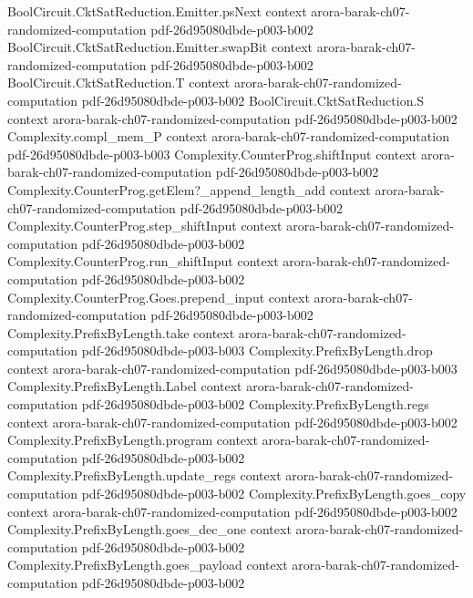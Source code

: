 \begin{theorem}
\proofstep
  {BoolCircuit.CktSatReduction.Emitter.psNext}
  {context}
  {arora-barak-ch07-randomized-computation}
  {pdf-26d95080dbde-p003-b002}
\proofstep
  {BoolCircuit.CktSatReduction.Emitter.swapBit}
  {context}
  {arora-barak-ch07-randomized-computation}
  {pdf-26d95080dbde-p003-b002}
\proofstep
  {BoolCircuit.CktSatReduction.T}
  {context}
  {arora-barak-ch07-randomized-computation}
  {pdf-26d95080dbde-p003-b002}
\proofstep
  {BoolCircuit.CktSatReduction.S}
  {context}
  {arora-barak-ch07-randomized-computation}
  {pdf-26d95080dbde-p003-b002}
\proofstep
  {Complexity.compl_mem_P}
  {context}
  {arora-barak-ch07-randomized-computation}
  {pdf-26d95080dbde-p003-b003}
\proofstep
  {Complexity.CounterProg.shiftInput}
  {context}
  {arora-barak-ch07-randomized-computation}
  {pdf-26d95080dbde-p003-b002}
\proofstep
  {Complexity.CounterProg.getElem?_append_length_add}
  {context}
  {arora-barak-ch07-randomized-computation}
  {pdf-26d95080dbde-p003-b002}
\proofstep
  {Complexity.CounterProg.step_shiftInput}
  {context}
  {arora-barak-ch07-randomized-computation}
  {pdf-26d95080dbde-p003-b002}
\proofstep
  {Complexity.CounterProg.run_shiftInput}
  {context}
  {arora-barak-ch07-randomized-computation}
  {pdf-26d95080dbde-p003-b002}
\proofstep
  {Complexity.CounterProg.Goes.prepend_input}
  {context}
  {arora-barak-ch07-randomized-computation}
  {pdf-26d95080dbde-p003-b002}
\proofstep
  {Complexity.PrefixByLength.take}
  {context}
  {arora-barak-ch07-randomized-computation}
  {pdf-26d95080dbde-p003-b003}
\proofstep
  {Complexity.PrefixByLength.drop}
  {context}
  {arora-barak-ch07-randomized-computation}
  {pdf-26d95080dbde-p003-b003}
\proofstep
  {Complexity.PrefixByLength.Label}
  {context}
  {arora-barak-ch07-randomized-computation}
  {pdf-26d95080dbde-p003-b002}
\proofstep
  {Complexity.PrefixByLength.regs}
  {context}
  {arora-barak-ch07-randomized-computation}
  {pdf-26d95080dbde-p003-b002}
\proofstep
  {Complexity.PrefixByLength.program}
  {context}
  {arora-barak-ch07-randomized-computation}
  {pdf-26d95080dbde-p003-b002}
\proofstep
  {Complexity.PrefixByLength.update_regs}
  {context}
  {arora-barak-ch07-randomized-computation}
  {pdf-26d95080dbde-p003-b002}
\proofstep
  {Complexity.PrefixByLength.goes_copy}
  {context}
  {arora-barak-ch07-randomized-computation}
  {pdf-26d95080dbde-p003-b002}
\proofstep
  {Complexity.PrefixByLength.goes_dec_one}
  {context}
  {arora-barak-ch07-randomized-computation}
  {pdf-26d95080dbde-p003-b002}
\proofstep
  {Complexity.PrefixByLength.goes_payload}
  {context}
  {arora-barak-ch07-randomized-computation}
  {pdf-26d95080dbde-p003-b002}

\end{theorem}
